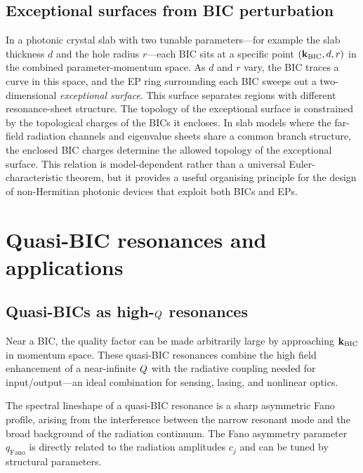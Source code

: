 \subsection{Exceptional surfaces from BIC perturbation}
\label{ssec:ep-surface}

In a photonic crystal slab with two tunable parameters---for example the
slab thickness $d$ and the hole radius $r$---each BIC sits at a
specific point $(\mathbf{k}_{\mathrm{BIC}}, d, r)$ in the combined
parameter-momentum space. As $d$ and $r$ vary, the BIC traces a curve
in this space, and the EP ring surrounding each BIC sweeps out a
two-dimensional \emph{exceptional surface}. This surface separates
regions with different resonance-sheet structure. The topology of the exceptional surface is constrained
by the topological charges of the BICs it encloses. In slab models where
the far-field radiation channels and eigenvalue sheets share a common
branch structure, the enclosed BIC charges determine the allowed topology
of the exceptional surface. This relation is model-dependent rather than
a universal Euler-characteristic theorem, but it provides a useful
organising principle for the design of non-Hermitian photonic devices
that exploit both BICs and EPs.


\section{Quasi-BIC resonances and applications}
\label{sec:quasi-bic}

\subsection{Quasi-BICs as high-$Q$ resonances}
\label{ssec:quasi-bic-resonances}

Near a BIC, the quality factor can be made arbitrarily large by
approaching $\mathbf{k}_{\mathrm{BIC}}$ in momentum space. These
quasi-BIC resonances combine the high field enhancement of a
near-infinite $Q$ with the radiative coupling needed for
input/output---an ideal combination for sensing, lasing, and
nonlinear optics.

The spectral lineshape of a quasi-BIC resonance is a sharp asymmetric
Fano profile, arising from the interference between the narrow resonant
mode and the broad background of the radiation continuum. The Fano
asymmetry parameter $q_{\mathrm{Fano}}$ is directly related to the
radiation amplitudes $c_j$ and can be tuned by structural parameters.

